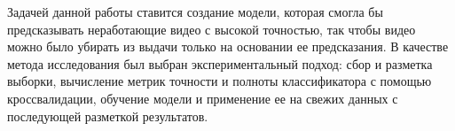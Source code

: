 Задачей данной работы ставится создание модели, которая смогла бы предсказывать неработающие видео с высокой точностью, так чтобы видео можно было убирать из выдачи только на основании ее предсказания. В качестве метода исследования был выбран экспериментальный подход: сбор и разметка выборки, вычисление метрик точности и полноты классификатора с помощью кроссвалидации, обучение модели и применение ее на свежих данных с последующей разметкой результатов.